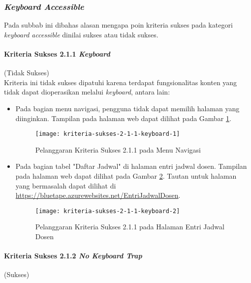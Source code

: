 \subsubsection{\textit{Keyboard Accessible}}
\label{subsubsec:kepatuhan_bluetape_keyboard_accessible}
Pada subbab ini dibahas alasan mengapa poin kriteria sukses pada kategori \textit{keyboard accessible} dinilai sukses atau tidak sukses.

\paragraph{Kriteria Sukses 2.1.1 \textit{Keyboard}}
\label{par:kepatuhan_bluetape_kriteria_sukses_2.1.1}
(Tidak Sukses)\\

Kriteria ini tidak sukses dipatuhi karena terdapat fungsionalitas konten yang tidak dapat dioperasikan melalui \textit{keyboard}, antara lain:

\begin{itemize}
    \item Pada bagian menu navigasi, pengguna tidak dapat memilih halaman yang diinginkan. Tampilan pada halaman web dapat dilihat pada Gambar \ref{fig:2.1.1_keyboard_1}.
    \begin{figure}[H]
        \centering  
        \texttt{[image: kriteria-sukses-2-1-1-keyboard-1]}  
        \caption[Pelanggaran Kriteria Sukses 2.1.1 pada Menu Navigasi]{Pelanggaran Kriteria Sukses 2.1.1 pada Menu Navigasi}
        \label{fig:2.1.1_keyboard_1}  
    \end{figure} 

    \item Pada bagian tabel "Daftar Jadwal" di halaman entri jadwal dosen. Tampilan pada halaman web dapat dilihat pada Gambar \ref{fig:2.1.1_keyboard_2}. Tautan untuk halaman yang bermasalah dapat dilihat di \url{https://bluetape.azurewebsites.net/EntriJadwalDosen}.
    \begin{figure}[H]
        \centering  
        \texttt{[image: kriteria-sukses-2-1-1-keyboard-2]}  
        \caption[Pelanggaran Kriteria Sukses 2.1.1 pada Halaman Entri Jadwal Dosen]{Pelanggaran Kriteria Sukses 2.1.1 pada Halaman Entri Jadwal Dosen}
        \label{fig:2.1.1_keyboard_2}  
    \end{figure} 
\end{itemize}

\paragraph{Kriteria Sukses 2.1.2 \textit{No Keyboard Trap}}
\label{par:kepatuhan_bluetape_kriteria_sukses_2.1.2}
(Sukses)\\


